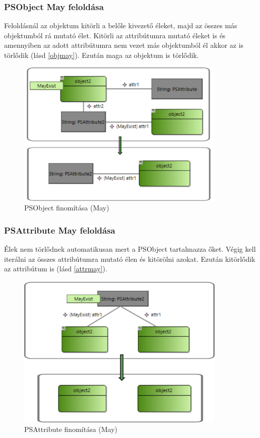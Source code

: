 \subsubsection{PSObject May feloldása}
Feloldásnál az objektum kitörli a belőle kivezető éleket, majd az összes más objektumból rá mutató élet. Kitörli az attribútumra mutató éleket is és amennyiben az adott attribútumra nem vezet más objektumból él akkor az is törlődik (lásd \autoref{objmay}). Ezután maga az objektum is törlődik.
\begin{figure}[!ht]
	\centering
	\includegraphics[width=100mm]{figures/objmay.pdf}
	\caption{PSObject finomítása (May)}
	\label{objmay} 
\end{figure}

\subsubsection{PSAttribute May feloldása}
Élek nem törlődnek automatikusan mert a PSObject tartalmazza őket. Végig kell iterálni az összes attribútumra mutató élen és kitörölni azokat. Ezután kitörlődik az attribútum is (lásd \autoref{attrmay}). 
\begin{figure}[!ht]
	\centering
	\includegraphics[width=100mm]{figures/attrmay.pdf}
	\caption{PSAttribute finomítása (May)}
	\label{attrmay} 
\end{figure}

